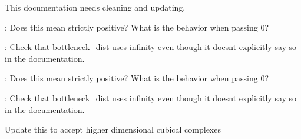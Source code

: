 
\begin{DoxyRefList}
\item[\label{todo__todo000001}%
\Hypertarget{todo__todo000001}%
Member \hyperlink{namespaceteaspoon_1_1_t_d_a_1_1_distance_ad3481b3888962dbf302bacb9d9504e8b}{teaspoon\+:\+:T\+DA\+:\+:Distance.dgm\+Dist\+\_\+\+Hera} (D1, D2, wass\+Deg=\textquotesingle{}Bottleneck\textquotesingle{}, rel\+Error=None, internal\+\_\+p=None)]This documentation needs cleaning and updating.

\+: Does this mean strictly positive? What is the behavior when passing 0? 

\+: Check that bottleneck\+\_\+dist uses infinity even though it doesn\textquotesingle{}t explicitly say so in the documentation.

\+: Does this mean strictly positive? What is the behavior when passing 0? 

\+: Check that bottleneck\+\_\+dist uses infinity even though it doesn\textquotesingle{}t explicitly say so in the documentation. 
\item[\label{todo__todo000005}%
\Hypertarget{todo__todo000005}%
Member \hyperlink{namespaceteaspoon_1_1_t_d_a_1_1_persistence_aa583aa9a694aeaa3983e77319ac68e84}{teaspoon\+:\+:T\+DA\+:\+:Persistence.Cubical\+\_\+\+Perseus} (M, num\+Digits=2, suppress\+Output=True)]Update this to accept higher dimensional cubical complexes 
\item[\label{todo__todo000004}%
\Hypertarget{todo__todo000004}%
Member \hyperlink{namespaceteaspoon_1_1_t_d_a_1_1_persistence_a0660fcd00ca57001f21bfaaefb1da9c3}{teaspoon\+:\+:T\+DA\+:\+:Persistence.dist\+Mat\+\_\+\+Perseus} ()]
\end{DoxyRefList}